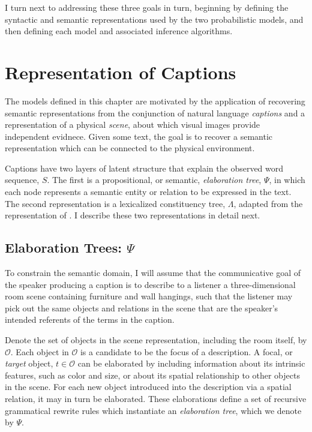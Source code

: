 \documentclass[12pt,letterpaper]{report}
\begin{document}
I turn next to addressing these three goals in turn, beginning by
defining the syntactic and semantic representations used by the two
probabilistic models, and then defining each model and associated
inference algorithms.

\section{Representation of Captions}
The models defined in this chapter are motivated by the application of
recovering semantic representations from the conjunction of natural
language {\it captions} and a representation of a physical {\it
  scene}, about which visual images provide independent evidnece.  
Given some text, the goal is to recover a semantic
representation which can be connected to the physical environment.

Captions have two layers of latent structure that explain the observed word
sequence, $S$.  The first is a propositional, or semantic, {\em
  elaboration tree}, $\Psi$, in which each node represents a semantic
entity or relation to be expressed in the text.  The second
representation is a lexicalized constituency tree, $\Lambda$, adapted from the
representation of \citet{collins2003head}.  I describe these two
representations in detail next.

\subsection{Elaboration Trees: $\Psi$}

To constrain the semantic domain, I will assume that the communicative 
goal of the speaker producing a caption is to describe to a listener 
a three-dimensional room scene containing furniture and wall hangings,
such that the listener may pick out the 
same objects and relations in the scene that are the speaker's
intended referents of the terms in the caption.  

Denote the set of objects in the scene representation, including the
room itself, by $\mathcal{O}$. 
Each object in $\mathcal{O}$ is a candidate to be the focus of a
description.  A focal, or
{\em target} object, $t \in \mathcal{O}$ can be elaborated by
including information about its intrinsic features, 
such as color and size, or about its spatial relationship to 
other objects in the scene.  For each new object introduced into 
the description via a spatial relation, it may in turn be elaborated.
These elaborations define a set of recursive grammatical rewrite rules
which instantiate an {\em elaboration tree}, which we denote by $\Psi$.
\end{document}
